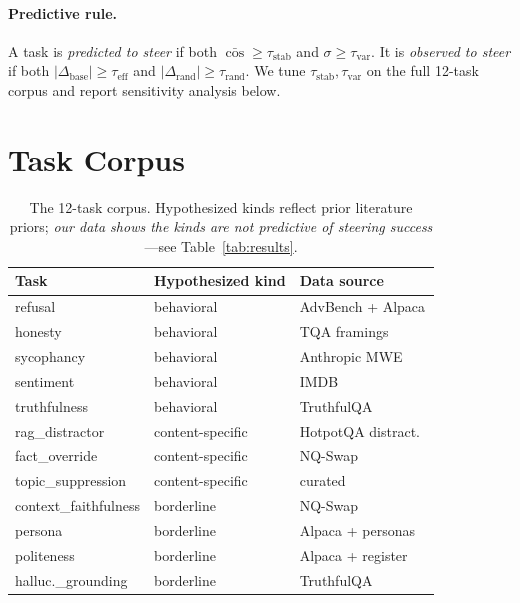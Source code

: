 \documentclass{article}
\begin{document}
\paragraph{Predictive rule.}
A task is \emph{predicted to steer} if both
$\bar{\cos} \geq \tau_{\text{stab}}$ and $\sigma \geq \tau_{\text{var}}$.
It is \emph{observed to steer} if both
$|\Delta_{\text{base}}| \geq \tau_{\text{eff}}$ and
$|\Delta_{\text{rand}}| \geq \tau_{\text{rand}}$.
We tune $\tau_{\text{stab}}, \tau_{\text{var}}$ on the full 12-task
corpus and report sensitivity analysis below.

\section{Task Corpus}

\begin{table}[t]
\centering\footnotesize
\setlength{\tabcolsep}{4pt}
\begin{tabular}{l l l}
\toprule
Task & Hypothesized kind & Data source \\
\midrule
refusal              & behavioral       & AdvBench + Alpaca \\
honesty              & behavioral       & TQA framings \\
sycophancy           & behavioral       & Anthropic MWE \\
sentiment            & behavioral       & IMDB \\
truthfulness         & behavioral       & TruthfulQA \\
\midrule
rag\_distractor      & content-specific & HotpotQA distract.~\\
fact\_override       & content-specific & NQ-Swap \\
topic\_suppression   & content-specific & curated \\
\midrule
context\_faithfulness & borderline      & NQ-Swap \\
persona              & borderline       & Alpaca + personas \\
politeness           & borderline       & Alpaca + register \\
halluc.\_grounding   & borderline       & TruthfulQA \\
\bottomrule
\end{tabular}
\caption{The 12-task corpus. Hypothesized kinds reflect prior
literature priors; \emph{our data shows the kinds are not
predictive of steering success}---see
Table~\ref{tab:results}.}
\label{tab:corpus}
\end{table}
\end{document}
